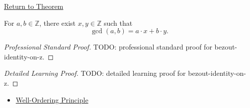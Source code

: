 \newpage
{}
\label{prf:bezout-identity-on-z}

\begin{remark*}[Return]
\hyperref[thm:bezout-identity-on-z]{Return to Theorem}
\end{remark*}

\begin{theorem*}
For $a,b\in\mathbb{Z}$, there exist $x,y\in\mathbb{Z}$ such that
\[
\gcd(a,b)=a\cdot x+b\cdot y.
\]
\end{theorem*}

\begin{proof}[Professional Standard Proof]
\LRAProofBodyStart
TODO: professional standard proof for bezout-identity-on-z.
\end{proof}

\begin{proof}[Detailed Learning Proof]
\LRAProofBodyStart
TODO: detailed learning proof for bezout-identity-on-z.
\end{proof}

\begin{remark*}
\end{remark*}

\begin{dependencies}
\begin{itemize}
  \item \hyperref[thm:well-ordering-principle]{Well-Ordering Principle}
\end{itemize}
\end{dependencies}

\clearpage
